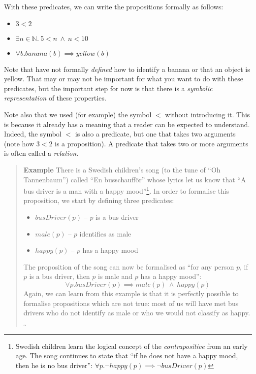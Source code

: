 \documentclass{tufte-handout}
\newcounter{example}
\newenvironment{example}
{\refstepcounter{example}\begin{quote}
\textbf{Example \arabic{example}}}
{

$\square$\end{quote}}
\begin{document}
With these predicates, we can write the propositions formally as
follows:

\begin{itemize}
\item $3 < 2$
\item $\exists n \in \mathbb{N} .~ 5 < n ~\land~ n < 10$
\item $\forall b. \mathit{banana}(b) \implies \mathit{yellow}(b)$
\end{itemize}

\noindent
Note that have not formally \emph{defined} how to identify a
banana or that an object is yellow. That may or may not be
important for what you want to do with these predicates, but the
important step for now is that there is a \emph{symbolic
  representation} of these properties.

Note also that we used (for example) the symbol $<$ without
introducing it. This is because it already has a meaning that a
reader can be expected to understand. Indeed, the symbol $<$ is
also a predicate, but one that takes two arguments (note how
$3 < 2$ is a proposition). A predicate that takes two or more
arguments is often called a \emph{relation}.

\begin{example}\label{ex:busdriver}
  There is a Swedish children's song (to the tune of ``Oh
  Tannenbaum'') called ``En busschauff\"{o}r'' whose lyrics let us
  know that ``A bus driver is a man with a happy
  mood''\footnote{Swedish children learn the logical concept of
    the \emph{contrapositive} from an early age. The song
    continues to state that ``if he does not have a happy mood,
    then he is no bus driver'':
    $\forall p. \lnot \mathit{happy}(p) \implies \lnot
    \mathit{busDriver}(p)$}. In order to formalise this
  proposition, we start by defining three predicates:
  \begin{itemize}
  \item $\mathit{busDriver}(p)$ -- $p$ is a bus driver
  \item $\mathit{male}(p)$ -- $p$ identifies as male
  \item $\mathit{happy}(p)$ -- $p$ has a happy mood
  \end{itemize}
  The proposition of the song can now be formalised as ``for any
  person $p$, if $p$ is a bus driver, then $p$ is male and $p$ has
  a happy mood'':
  \[
    \forall p.
    \mathit{busDriver}(p) \implies
    \mathit{male}(p) ~\land~
    \mathit{happy}(p)
  \]
  Again, we can learn from this example is that it is perfectly
  possible to formalise propositions which are not true: most of
  us will have met bus drivers who do not identify as male or who
  we would not classify as happy.
\end{example}
\end{document}
